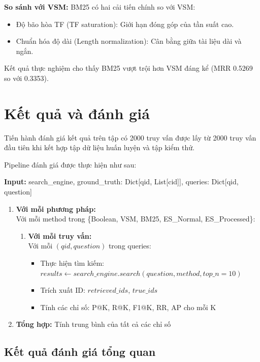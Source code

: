 \documentclass[../BTL.tex]{subfiles}
\begin{document}
\textbf{So sánh với VSM:} BM25 có hai cải tiến chính so với VSM:
\begin{itemize}
    \item Độ bão hòa TF (TF saturation): Giới hạn đóng góp của tần suất cao.
    \item Chuẩn hóa độ dài (Length normalization): Cân bằng giữa tài liệu dài và ngắn.
\end{itemize}

Kết quả thực nghiệm cho thấy BM25 vượt trội hơn VSM đáng kể (MRR 0.5269 so với 0.3353).


\section{Kết quả và đánh giá}
Tiến hành đánh giá kết quả trên tập có 2000 truy vấn được lấy từ 2000 truy vấn đầu tiên khi kết hợp tập dữ liệu huấn luyện và tập kiểm thử.

Pipeline đánh giá được thực hiện như sau:
\begin{algorithm}
\caption{Pipeline đánh giá}
\textbf{Input:} search\_engine, ground\_truth: Dict[qid, List[cid]], queries: Dict[qid, question]

\begin{enumerate}
    \item \textbf{Với mỗi phương pháp:}\\
    Với mỗi method trong \{Boolean, VSM, BM25, ES\_Normal, ES\_Processed\}:
    \begin{enumerate}
        \item \textbf{Với mỗi truy vấn:}\\
        Với mỗi $(qid, question)$ trong queries:
        \begin{itemize}
            \item Thực hiện tìm kiếm: $results \gets search\_engine.search(question, method, top\_n=10)$
            \item Trích xuất ID: $retrieved\_ids$, $true\_ids$
            \item Tính các chỉ số: P@K, R@K, F1@K, RR, AP cho mỗi K
        \end{itemize}
    \end{enumerate}
    \item \textbf{Tổng hợp:} Tính trung bình của tất cả các chỉ số
\end{enumerate}
\end{algorithm}


\subsection{Kết quả đánh giá tổng quan}
\end{document}
